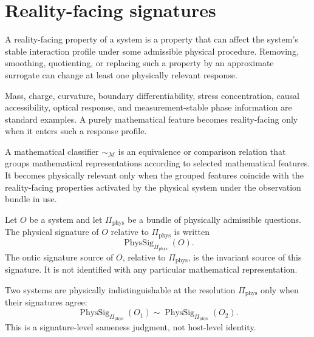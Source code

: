 \section{Reality-facing signatures}
\label{sec:reality-constrained-signatures}

\begin{definition}
\label{def:reality-facing-property}
A reality-facing property of a system is a property that can affect the system's stable interaction profile under some admissible physical procedure. Removing, smoothing, quotienting, or replacing such a property by an approximate surrogate can change at least one physically relevant response.
\end{definition}

Mass, charge, curvature, boundary differentiability, stress concentration, causal accessibility, optical response, and measurement-stable phase information are standard examples. A purely mathematical feature becomes reality-facing only when it enters such a response profile.

\begin{definition}
\label{def:reality-constrained-mathematical-classifier}
A mathematical classifier $\sim_{\mathcal M}$ is an equivalence or comparison relation that groups mathematical representations according to selected mathematical features. It becomes physically relevant only when the grouped features coincide with the reality-facing properties activated by the physical system under the observation bundle in use.
\end{definition}

\begin{definition}
\label{def:ontic-signature-source}
Let $O$ be a system and let $\Pi_{\mathrm{phys}}$ be a bundle of physically admissible questions. The physical signature of $O$ relative to $\Pi_{\mathrm{phys}}$ is written
$$
\operatorname{PhysSig}_{\Pi_{\mathrm{phys}}}(O).
$$
The ontic signature source of $O$, relative to $\Pi_{\mathrm{phys}}$, is the invariant source of this signature. It is not identified with any particular mathematical representation.
\end{definition}

Two systems are physically indistinguishable at the resolution $\Pi_{\mathrm{phys}}$ only when their signatures agree:
$$
\operatorname{PhysSig}_{\Pi_{\mathrm{phys}}}(O_1)
\sim
\operatorname{PhysSig}_{\Pi_{\mathrm{phys}}}(O_2).
$$
This is a signature-level sameness judgment, not host-level identity.

